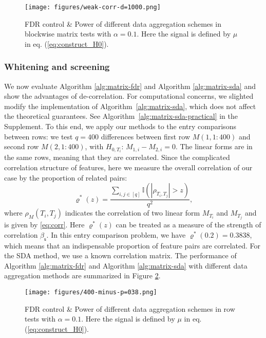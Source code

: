 \documentclass[12pt]{article}
\newcommand{\abs}[1]{\left\lvert#1\right\rvert}
\newcommand{\bbI}{\mathbb{I}}
\theoremstyle{plain}
\begin{document}
\begin{sloppypar}
\begin{figure}
\centering
     \texttt{[image: figures/weak-corr-d=1000.png]}
 \caption{FDR control \& Power of different data aggregation schemes in blockwise matrix tests with $\alpha=0.1$.  Here the signal is defined by $\mu$ in eq. (\ref{eq:construct_H0}). }
 \label{fig:fdr-simu}
\end{figure}

\subsubsection{Whitening and screening}
We now evaluate Algorithm \ref{alg:matrix-fdr} and Algorithm \ref{alg:matrix-sda} and show the advantages of de-correlation. For computational concerns, we slighted modify the implementation of Algorithm~\ref{alg:matrix-sda}, which does not affect the theoretical guarantees. See Algorithm~\ref{alg:matrix-sda-practical} in the Supplement. 
To this end, we apply our methods to the entry comparisons between rows: we test $q=400$ differences between first row $M(1,1:400)$ and second row $M(2,1:400)$, with $H_{0,T_i}$: $M_{1,i}-M_{2,i}=0$.  The linear forms are in the same rows, meaning that they are correlated. Since the complicated correlation structure of features, here we measure the overall correlation of our case by the proportion of related pairs: 
\begin{equation*}
    \varrho^*(z)=\frac{\sum_{i,j\in[q] } \bbI\left( \abs{\rho_{T_i, T_j} }> z\right)   }{q^2},
\end{equation*}
where $\rho_M (T_i,T_j)$ indicates the correlation of two linear form $M_{T_i}$ and $M_{T_j}$ and is given by \eqref{eq:corr}. 
Here $\varrho^*(z)$ can be treated as a measure of the strength of correlation $\beta_{\mathsf{s}}$. In this entry comparison problem, we have $\varrho^*(0.2)=0.3838 $, which means that an indispensable proportion of feature pairs are correlated. For the SDA method, we use a known correlation matrix. 
The performance of Algorithm \ref{alg:matrix-fdr} and Algorithm \ref{alg:matrix-sda} with different data aggregation methods are summarized in Figure \ref{fig:fdr-sda-simu}.
\begin{figure}
\centering
     \texttt{[image: figures/400-minus-p=038.png]}
 \caption{FDR control \& Power of different data aggregation schemes in row tests with $\alpha=0.1$. Here the signal is defined by $\mu$ in eq. (\ref{eq:construct_H0}). }
 \label{fig:fdr-sda-simu}

\end{figure}
\end{sloppypar}
\end{document}
